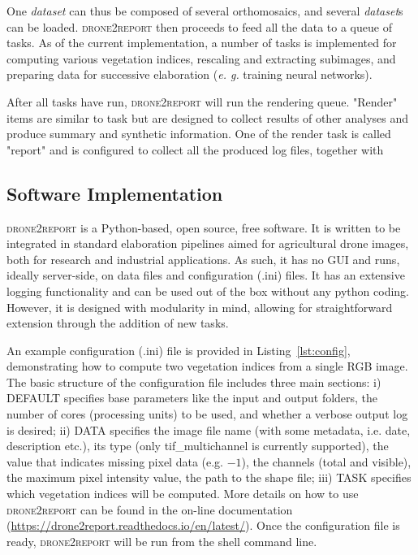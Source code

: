 \documentclass[drones,technicalnote,accept,pdftex,moreauthors]{Definitions/mdpi}
\begin{document}
One \textit{dataset} can thus be composed of several orthomosaics, and several \textit{dataset}s can be loaded. \textsc{drone2report} then proceeds to feed all the data to a queue of tasks. As of the current implementation, a number of tasks is implemented for computing various vegetation indices, rescaling and extracting subimages, and preparing data for successive elaboration (\textit{e. g.} training neural networks). 

After all tasks have run, \textsc{drone2report} will run the rendering queue. "Render" items are similar to task but are designed to collect results of other analyses and produce summary and synthetic information. One of the render task is called "report" and is configured to collect all the produced log files, together with 

\subsection{Software Implementation}

\textsc{drone2report} is a Python-based, open source, free software. It is written to be integrated in standard elaboration pipelines aimed for agricultural drone images, both for research and industrial applications. As such, it has no GUI and runs, ideally server-side, on data files and configuration (.ini) files. It has an extensive logging functionality and can be used out of the box without any python coding. However, it is designed with modularity in mind, allowing for straightforward extension through the addition of new tasks.

An example configuration (.ini) file is provided in Listing~\ref{lst:config}, demonstrating how to compute two vegetation indices from a single RGB image.
The basic structure of the configuration file includes three main sections: i) DEFAULT specifies base parameters like the input and output folders, the number of cores (processing units) to be used, and whether a verbose output log is desired; ii) DATA specifies the image file name (with some metadata, i.e. date, description etc.), its type (only tif\_multichannel is currently supported), the value that indicates missing pixel data (e.g. $-1$), the channels (total and visible), the maximum pixel intensity value, the path to the shape file; iii) TASK specifies which vegetation indices will be computed. 
More details on how to use \textsc{drone2report} can be found in the on-line documentation (\url{https://drone2report.readthedocs.io/en/latest/}).
Once the configuration file is ready, \textsc{drone2report} will be run from the shell command line.
\end{document}
